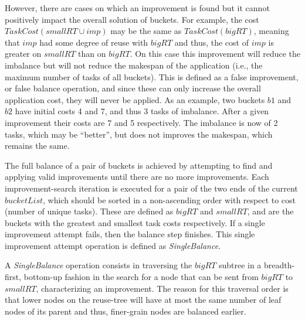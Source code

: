 However, there are cases on which an improvement is found but it cannot positively impact the overall solution of buckets. For example, the cost $TaskCost(smallRT \cup imp)$ may be the same as $TaskCost(bigRT)$, meaning that $imp$ had some degree of reuse with $bigRT$ and thus, the cost of $imp$ is greater on $smallRT$ than on $bigRT$. On this case this improvement will reduce the imbalance but will not reduce the makespan of the application (i.e., the maximum number of tasks of all buckets). This is defined as a false improvement, or false balance operation, and since these can only increase the overall application cost, they will never be applied. As an example, two buckets $b1$ and $b2$ have initial costs 4 and 7, and thus 3 tasks of imbalance. After a given improvement their costs are 7 and 5 respectively. The imbalance is now of 2 tasks, which may be ``better'', but does not improves the makespan, which remains the same.

The full balance of a pair of buckets is achieved by attempting to find and applying valid improvements until there are no more improvements. Each improvement-search iteration is executed for a pair of the two ends of the current $bucketList$, which should be sorted in a non-ascending order with respect to cost (number of unique tasks). These are defined as $bigRT$ and $smallRT$, and are the buckets with the greatest and smallest task costs respectively. If a single improvement attempt fails, then the balance step finishes. This single improvement attempt operation is defined as {\em SingleBalance}.

A {\em SingleBalance} operation consists in traversing the $bigRT$ subtree in a breadth-first, bottom-up fashion in the search for a node that can be sent from $bigRT$ to $smallRT$, characterizing an improvement. The reason for this traversal order is that lower nodes on the reuse-tree will have at most the same number of leaf nodes of its parent and thus, finer-grain nodes are balanced earlier.

